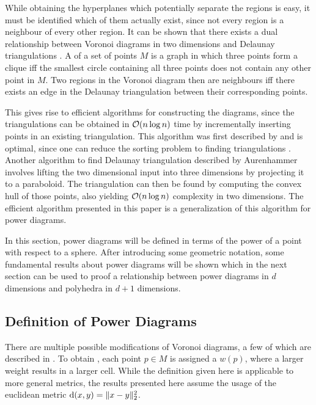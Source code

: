 While obtaining the hyperplanes which potentially separate the regions is easy, it must be identified which of them actually exist, since not every region is a neighbour of every other region.
It can be shown that there exists a dual relationship between Voronoi diagrams in two dimensions and Delaunay triangulations \cite{aurenhammer1991voronoi}.
A  of a set of points $M$ is a graph in which three points form a clique iff the smallest circle containing all three points does not contain any other point in $M$.
Two regions in the Voronoi diagram then are neighbours iff there exists an edge in the Delaunay triangulation between their corresponding points.

This gives rise to efficient algorithms for constructing the diagrams, since the triangulations can be obtained in $\mathcal{O}(n \log n)$ time by incrementally inserting points in an existing triangulation.
This algorithm was first described by \textcite{green1978computing} and is optimal, since one can reduce the sorting problem to finding triangulations \cite{aurenhammer1991voronoi}.
Another algorithm to find Delaunay triangulation described by Aurenhammer involves lifting the two dimensional input into three dimensions by projecting it to a paraboloid.
The triangulation can then be found by computing the convex hull of those points, also yielding $\mathcal{O}(n \log n)$ complexity in two dimensions.
The efficient algorithm presented in this paper is a generalization of this algorithm for power diagrams.

In this section, power diagrams will be defined in terms of the power of a point with respect to a sphere.
After introducing some geometric notation, some fundamental results about power diagrams will be shown which in the next section can be used to proof a relationship between power diagrams in $d$ dimensions and polyhedra in $d + 1$ dimensions.

\subsection{Definition of Power Diagrams}
\label{sub:definition_of_power_diagrams}
There are multiple possible modifications of Voronoi diagrams, a few of which are described in \cite{aurenhammer1987power}.
To obtain , each point $p \in M$ is assigned a  $w(p)$, where a larger weight results in a larger cell.
While the definition given here is applicable to more general metrics, the results presented here assume the usage of the euclidean metric $\operatorname{d}(x, y) = \Vert x - y \Vert_2^2$.

